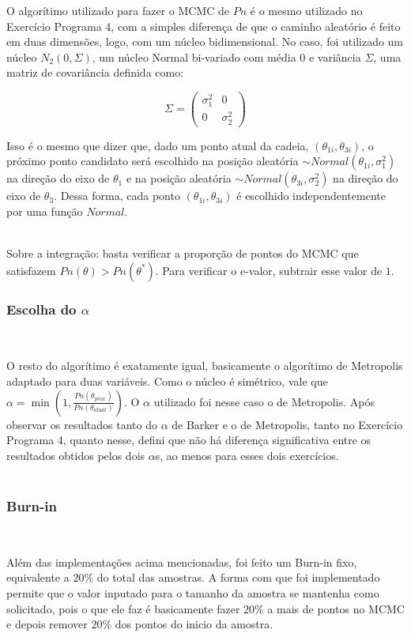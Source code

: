 \documentclass[pt12]{article}
\begin{document}
O algorítimo utilizado para fazer o MCMC de $Pn$ é o mesmo utilizado no Exercício Programa 4, com a simples diferença de que o caminho aleatório é feito em duas dimensões, logo, com um núcleo bidimensional. No caso, foi utilizado um núcleo $N_2(0,\Sigma)$, um núcleo Normal bi-variado com média $0$ e variância $\Sigma$, uma matriz de covariância definida como:

$$\Sigma = \begin{pmatrix}
\sigma_1^2 & 0\\
0 & \sigma_2^2
\end{pmatrix}$$

Isso é o mesmo que dizer que, dado um ponto atual da cadeia, $(\theta_{1i},\theta_{3i})$, o próximo ponto candidato será escolhido na posição aleatória $\sim Normal(\theta_{1i},\sigma_1^2)$ na direção do eixo de $\theta_1$ e na posição aleatória $\sim Normal(\theta_{3i},\sigma_2^2)$ na direção do eixo de $\theta_3$.
Dessa forma, cada ponto $(\theta_{1i},\theta_{3i})$ é escolhido independentemente por uma função $Normal$.\\
\ 

Sobre a integração: basta verificar a proporção de pontos do MCMC que satisfazem $Pn(\theta)>Pn(\theta^*)$. Para verificar o e-valor, subtrair esse valor de $1$.
\subsubsection{Escolha do $\alpha$}
\ 

O resto do algorítimo é exatamente igual, basicamente o algorítimo de Metropolis adaptado para duas variáveis. Como o núcleo é simétrico, vale que $\displaystyle{\alpha = \min\left(1,\frac{Pn(\theta_{prox})}{Pn(\theta_{atual})}\right)}$. O $\alpha$ utilizado foi nesse caso o de Metropolis. Após observar os resultados tanto do $\alpha$ de Barker e o de Metropolis, tanto no Exercício Programa 4, quanto nesse, defini que não há diferença significativa entre os resultados obtidos pelos dois $\alpha$s, ao menos para esses dois exercícios.\\
\ 

\subsubsection{Burn-in}
\ 

Além das implementações acima mencionadas, foi feito um Burn-in fixo, equivalente a $20\%$ do total das amostras. A forma com que foi implementado permite que o valor inputado para o tamanho da amostra se mantenha como solicitado, pois o que ele faz é basicamente fazer $20\%$ a mais de pontos no MCMC e depois remover $20\%$ dos pontos do inicio da amostra.\\
\ 
\end{document}
